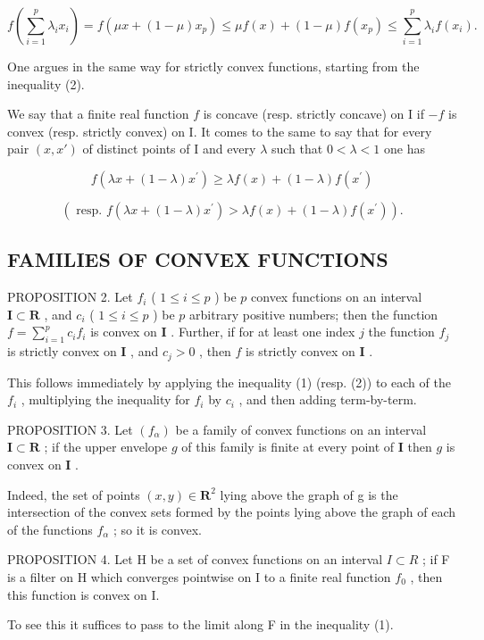 \[
f \left(\sum_ {i = 1} ^ {p} \lambda_ {i} x _ {i}\right) = f (\mu x + (1 - \mu) x _ {p}) \leqslant \mu f (x) + (1 - \mu) f (x _ {p}) \leqslant \sum_ {i = 1} ^ {p} \lambda_ {i} f (x _ {i}).
\]

One argues in the same way for strictly convex functions, starting from the inequality (2).

We say that a finite real function \(f\) is concave (resp. strictly concave) on I if \(-f\) is convex (resp. strictly convex) on I. It comes to the same to say that for every pair \((x, x')\) of distinct points of I and every \(\lambda\) such that \(0 < \lambda < 1\) one has

\[
f (\lambda x + (1 - \lambda) x ^ {\prime}) \geqslant \lambda f (x) + (1 - \lambda) f (x ^ {\prime})
\]

\[
(\text { resp. } f (\lambda x + (1 - \lambda) x ^ {\prime}) > \lambda f (x) + (1 - \lambda) f (x ^ {\prime})).
\]

\subsection{FAMILIES OF CONVEX FUNCTIONS}

PROPOSITION 2. Let \(f_{i}\) ( \(1 \leqslant i \leqslant p\) ) be \(p\) convex functions on an interval \(\mathbf{I} \subset \mathbf{R}\) , and \(c_{i}\) ( \(1 \leqslant i \leqslant p\) ) be \(p\) arbitrary positive numbers; then the function \(f = \sum_{i=1}^{p} c_{i} f_{i}\) is convex on \(\mathbf{I}\) . Further, if for at least one index \(j\) the function \(f_{j}\) is strictly convex on \(\mathbf{I}\) , and \(c_{j} > 0\) , then \(f\) is strictly convex on \(\mathbf{I}\) .

This follows immediately by applying the inequality (1) (resp. (2)) to each of the \(f_{i}\) , multiplying the inequality for \(f_{i}\) by \(c_{i}\) , and then adding term-by-term.

PROPOSITION 3. Let \((f_{\alpha})\) be a family of convex functions on an interval \(\mathbf{I} \subset \mathbf{R}\) ; if the upper envelope \(g\) of this family is finite at every point of \(\mathbf{I}\) then \(g\) is convex on \(\mathbf{I}\) .

Indeed, the set of points \((x, y) \in \mathbf{R}^{2}\) lying above the graph of g is the intersection of the convex sets formed by the points lying above the graph of each of the functions \(f_{\alpha}\) ; so it is convex.

PROPOSITION 4. Let H be a set of convex functions on an interval \(I \subset R\) ; if F is a filter on H which converges pointwise on I to a finite real function \(f_{0}\) , then this function is convex on I.

To see this it suffices to pass to the limit along F in the inequality (1).
